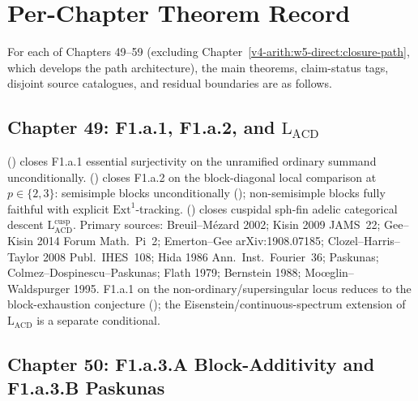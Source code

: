 \section{Per-Chapter Theorem Record}
\label{v4-arith:w5-synth:per-chapter}

For each of Chapters 49--59 (excluding
Chapter~\ref{v4-arith:w5-direct:closure-path}, which develops the
path architecture), the main theorems, claim-status tags, disjoint
source catalogues, and residual boundaries are as follows.

\subsection{Chapter 49: F1.a.1, F1.a.2, and \(\mathrm{L}_{\mathrm{ACD}}\)}
\label{v4-arith:w5-synth:ch49}

 (\ClaimStatusProvedHere)
closes F1.a.1 essential surjectivity on the unramified ordinary
summand unconditionally.
 (\ClaimStatusProvedHere) closes F1.a.2
on the block-diagonal local comparison at \(p\in\{2,3\}\): semisimple
blocks unconditionally
(); non-semisimple blocks
fully faithful with explicit \(\mathrm{Ext}^{1}\)-tracking.
 (\ClaimStatusProvedHere)
closes cuspidal sph-fin adelic categorical descent
\(\mathrm{L}_{\mathrm{ACD}}^{\mathrm{cusp}}\).
Primary sources: Breuil--M{\'e}zard 2002; Kisin 2009 JAMS~22;
Gee--Kisin 2014 Forum Math.~Pi~2; Emerton--Gee arXiv:1908.07185;
Clozel--Harris--Taylor 2008 Publ.~IHES~108; Hida 1986
Ann.~Inst.~Fourier~36; Paskunas; Colmez--Dospinescu--Paskunas;
Flath 1979; Bernstein 1988; Mo{\oe}glin--Waldspurger 1995.
F1.a.1 on the non-ordinary/supersingular locus reduces to the
block-exhaustion conjecture
();
the Eisenstein/continuous-spectrum extension of
\(\mathrm{L}_{\mathrm{ACD}}\) is a separate conditional.

\subsection{Chapter 50: F1.a.3.A Block-Additivity and F1.a.3.B Paskunas}
\label{v4-arith:w5-synth:ch50}

